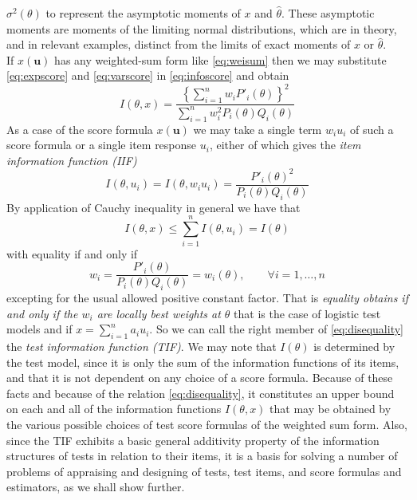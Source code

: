 $\sigma^2(\theta)$ to represent the asymptotic moments of $x$ and $\hat{\theta}$. These asymptotic moments are moments of the limiting normal distributions, which are in theory, and in relevant examples, distinct from the limits of exact moments of $x$ or $\hat{\theta}$.\\
If $x(\boldsymbol{u})$ has any weighted-sum form like \eqref{eq:weisum} then we may substitute
\eqref{eq:expscore} and \eqref{eq:varscore} in \eqref{eq:infoscore} and obtain
\begin{equation}\label{eq:info1}
I(\theta,x)=\frac{\left\{ \sum_{i=1}^n w_i P'_i(\theta) \right\}^2}{ \sum_{i=1}^n w^2_iP_i(\theta)Q_i(\theta)}
\end{equation}
As a case of the score formula $x(\boldsymbol{u})$ we may take a single term $w_iu_i$ of such
a score formula or a single item response $u_i$, either of which gives the \emph{item information function (IIF)}
\begin{equation}\label{eq:IIF}
I(\theta,u_i)=I(\theta,w_iu_i)=\frac{P'_i(\theta)^2 }{P_i(\theta)Q_i(\theta)}
\end{equation}
By application of Cauchy inequality in general we have that
\begin{equation}\label{eq:disequality}
I(\theta,x)\leq \sum_{i=1}^n{I(\theta, u_i)}=I(\theta)
\end{equation}
with equality if and only if
\begin{equation}
w_i=\frac{P'_i(\theta) }{P_i(\theta)Q_i(\theta)}=w_i(\theta), \qquad \forall i=1,\ldots, n
\end{equation}
excepting for the usual allowed positive constant factor. That is \emph{equality
obtains if and only if the $w_i$ are locally best weights at $\theta$} that is the case of logistic test models and if $x=\sum_{i=1}^na_iu_i$.
So we can call the right member of \eqref{eq:disequality} the \emph{test information function (TIF)}.
We may note that $I(\theta)$ is determined by the test model, since it is only the sum of the information functions of its items, and that it is not dependent on any choice of a score formula.
Because of these facts and because of the relation \eqref{eq:disequality}, it constitutes an upper bound on each and all of the information functions $I(\theta,x)$ that may be obtained by the various possible choices of test score formulas of the weighted sum form.
Also, since the TIF exhibits a basic general additivity property of the information structures of tests in relation to their items, it is a basis for solving a number of problems of appraising and designing of tests, test items, and score formulas and estimators, as we shall show further. \\
